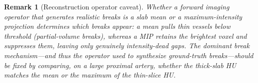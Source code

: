 \documentclass[11pt]{article}
\newtheorem{remark}{Remark}
\begin{document}
\begin{remark}[Reconstruction operator caveat]
\label{rem:mip}
Whether a forward imaging operator that generates realistic breaks is a slab
\emph{mean} or a \emph{maximum-intensity projection} determines which breaks appear:
a mean pulls thin vessels below threshold (partial-volume breaks), whereas a MIP
retains the brightest voxel and suppresses them, leaving only genuinely
intensity-dead gaps. The dominant break mechanism---and thus the operator used to
synthesize ground-truth breaks---should be fixed by comparing, on a large proximal
artery, whether the thick-slab HU matches the mean or the maximum of the thin-slice
HU.
\end{remark}
\end{document}
